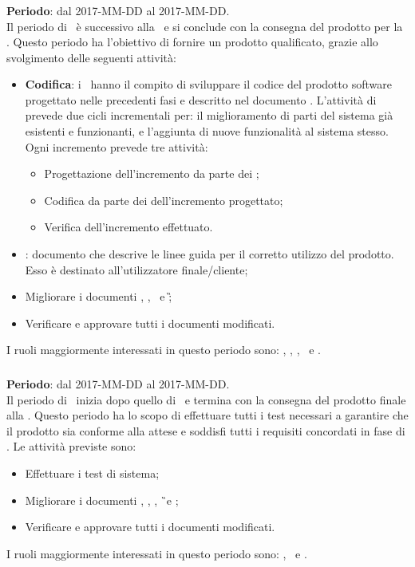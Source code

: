 		\subsubsection{\CO}
		\textbf{Periodo}: dal 2017-MM-DD al 2017-MM-DD.\\
		Il periodo di \CO\ è successivo alla \PD\ e si conclude con la consegna	del prodotto per la \RQ. Questo periodo ha l'obiettivo di fornire un prodotto qualificato, grazie allo svolgimento delle seguenti attività:
		\begin{itemize}
			\item \textbf{Codifica}: i \Progrs\ hanno il compito di sviluppare il codice del prodotto software progettato nelle precedenti fasi e descritto nel documento \DDP. L’attività di \CO prevede due cicli incrementali per: il miglioramento
			di parti del sistema già esistenti e funzionanti, e l’aggiunta di nuove funzionalità al sistema stesso.
			Ogni incremento prevede tre attività:
			\begin{itemize}
				\item Progettazione dell’incremento da parte dei \Progs;
				\item Codifica da parte dei \Progrs dell’incremento progettato;
				\item Verifica dell’incremento effettuato.
			\end{itemize}
			\item \textit{\MU}: documento che descrive le linee guida per il corretto utilizzo del prodotto. Esso è destinato all’utilizzatore finale/cliente;
			\item  Migliorare i documenti \NdP, \PdP, \PdQ\ e \G;
			\item Verificare e approvare tutti i documenti modificati.
		\end{itemize}
		I ruoli maggiormente interessati in questo periodo sono: \Amm, \Res, \Prog, \Progr\ e \Ver.
		
		\subsubsection{\VV}
		\textbf{Periodo}: dal 2017-MM-DD al 2017-MM-DD.\\
		Il periodo di \VV\ inizia dopo quello di \CO\ e termina con la consegna del prodotto finale alla \RA. Questo periodo ha lo scopo di effettuare tutti i test necessari a garantire che il prodotto sia conforme alla attese e soddisfi tutti i requisiti concordati in fase di \AdR. Le attività previste sono:
		\begin{itemize}
			\item Effettuare i test di sistema;
			\item Migliorare i documenti \NdP, \PdP, \PdQ, \G\ e \MU;
			\item Verificare e approvare tutti i documenti modificati.
		\end{itemize}
			I ruoli maggiormente interessati in questo periodo sono: \Res, \Prog\ e \Ver.